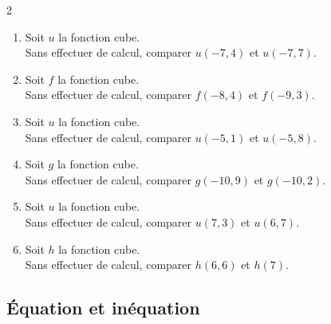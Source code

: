 {%
\begin{Exercice}%
\leavevmode\vspace{-\baselineskip}
\begin{multicols}{2}
\begin{enumerate}[itemsep=1.5em]
	\item \begin{minipage}[t]{\linewidth} Soit $u$ la fonction cube.\\
            Sans effectuer de calcul, comparer $u(-7{,}4)$ et $u(-7{,}7)$. \end{minipage}
	\item \begin{minipage}[t]{\linewidth} Soit $f$ la fonction cube.\\
            Sans effectuer de calcul, comparer $f(-8{,}4)$ et $f(-9{,}3)$. \end{minipage}
	\item \begin{minipage}[t]{\linewidth} Soit $u$ la fonction cube.\\
            Sans effectuer de calcul, comparer $u(-5{,}1)$ et $u(-5{,}8)$. \end{minipage}
	\item \begin{minipage}[t]{\linewidth} Soit $g$ la fonction cube.\\
            Sans effectuer de calcul, comparer $g(-10{,}9)$ et $g(-10{,}2)$. \end{minipage}
	\item \begin{minipage}[t]{\linewidth} Soit $u$ la fonction cube.\\
            Sans effectuer de calcul, comparer $u(7{,}3)$ et $u(6{,}7)$. \end{minipage}
	\item \begin{minipage}[t]{\linewidth} Soit $h$ la fonction cube.\\
            Sans effectuer de calcul, comparer $h(6{,}6)$ et $h(7)$. \end{minipage}
\end{enumerate}
\end{multicols}
\end{Exercice}

\newpage

\subsection*{Équation et inéquation}


}
